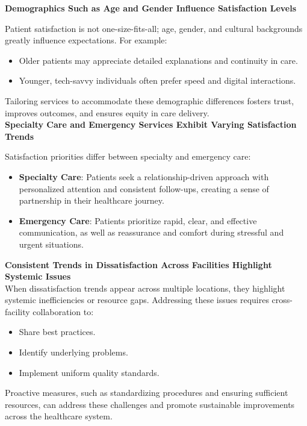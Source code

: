 \noindent\textbf{Demographics Such as Age and Gender Influence Satisfaction Levels}

\noindent Patient satisfaction is not one-size-fits-all; age, gender, and cultural backgrounds greatly influence expectations. For example:\\
\begin{itemize}
    \item Older patients may appreciate detailed explanations and continuity in care.
    \item Younger, tech-savvy individuals often prefer speed and digital interactions.
\end{itemize}
Tailoring services to accommodate these demographic differences fosters trust, improves outcomes, and ensures equity in care delivery.\\

\noindent\textbf{Specialty Care and Emergency Services Exhibit Varying Satisfaction Trends}

Satisfaction priorities differ between specialty and emergency care:
\begin{itemize}
    \item \textbf{Specialty Care}: Patients seek a relationship-driven approach with personalized attention and consistent follow-ups, creating a sense of partnership in their healthcare journey.
    \item \textbf{Emergency Care}: Patients prioritize rapid, clear, and effective communication, as well as reassurance and comfort during stressful and urgent situations.\\
\end{itemize}

\noindent\textbf{Consistent Trends in Dissatisfaction Across Facilities Highlight Systemic Issues}\\

When dissatisfaction trends appear across multiple locations, they highlight systemic inefficiencies or resource gaps. Addressing these issues requires cross-facility collaboration to:
\begin{itemize}
    \item Share best practices.
    \item Identify underlying problems.
    \item Implement uniform quality standards.
\end{itemize}
Proactive measures, such as standardizing procedures and ensuring sufficient resources, can address these challenges and promote sustainable improvements across the healthcare system.

